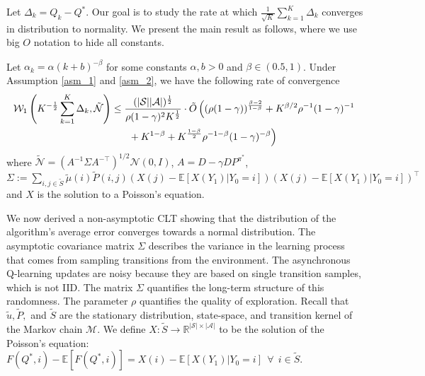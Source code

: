 \documentclass{opt2025} %
\begin{document}
Let $\Delta_k = Q_k - Q^*$. Our goal is to study the rate at which $\frac{1}{\sqrt{K}}\sum_{k=1}^K \Delta_k$ converges in distribution to normality. We present the main result as follows, where we use big $O$ notation to hide all constants.
\begin{theorem}
\label{thm_CLT}
Let $\alpha_k=\alpha(k+b)^{-\beta}$ for some constants $\alpha,b>0$ and $\beta \in(0.5,1)$. Under Assumption \ref{asm_1} and \ref{asm_2}, we have the following rate of convergence 
\begin{align*}
\mathcal{W}_1 \left( K^{-\frac{1}{2}} \sum_{k=1}^K\Delta_{k}, \tilde{\mathcal{N}} \right) &\leq \frac{({|\mathcal{S}||\mathcal{A}|})^{\frac{1}{2}}}{\rho(1-\gamma)^2{K}^{\frac{1}{2}}} \cdot \tilde{O}\left( (\rho(1-\gamma))^{\frac{\beta-2}{1-\beta}} + K^{\beta/2}\rho^{-1}(1-\gamma)^{-1}  \right.\\
&\left. \indent + K^{1-\beta} + K^{\frac{1-\beta}{2}}\rho^{-1-\beta}(1-\gamma)^{-\beta} \right)
\end{align*}
where $\tilde{\mathcal{N}}=(A^{-1}\Sigma A^{-\top})^{1/2}\mathcal{N}(0,I)$, $A=D-\gamma DP^{\pi^*}$, $\Sigma := \sum_{i,j\in \tilde{S}} \tilde{\mu}(i)  \tilde{P}(i,j) (X(j) - \mathbb{E}[X(Y_1)|Y_0=i])(X(j) - \mathbb{E}[X(Y_1)|Y_0=i])^{\top}$ and $X$ is the solution to a Poisson's equation.
\end{theorem}
We now derived a non-asymptotic CLT showing that the distribution of the algorithm's average error converges towards a normal distribution. The asymptotic covariance matrix $\Sigma$ describes the variance in the learning process that comes from sampling transitions from the environment. The asynchronous Q-learning updates are noisy because they are based on single transition samples, which is not IID. The matrix $\Sigma$ quantifies the long-term structure of this randomness. The parameter $\rho$ quantifies the quality of exploration. Recall that $\tilde{u}, \tilde{P},$ and $\tilde{S}$ are the stationary distribution, state-space, and transition kernel of the Markov chain $\mathcal{M}$. We define $X: \tilde{S}\rightarrow \mathbb{R}^{|\mathcal{S}|\times|\mathcal{A}|}$ to be the solution of the Poisson's equation: $F(Q^*, i) - \mathbb{E}[F(Q^*, i)] = X(i) - \mathbb{E}[X(Y_1)| Y_0=i] \ \ \forall \ \ i\in \tilde{S}$.
\end{document}
